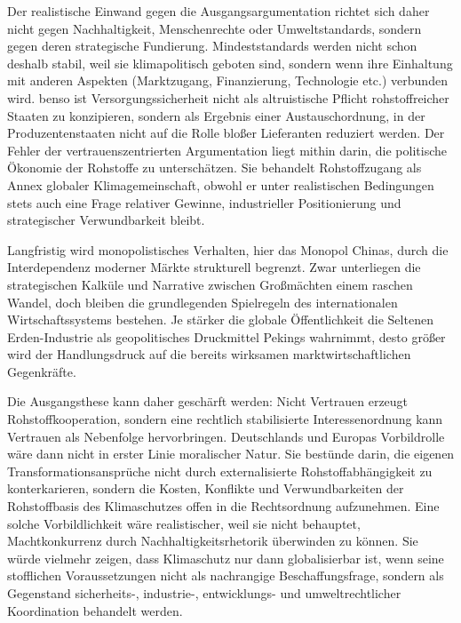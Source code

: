 \documentclass[12pt,a4paper,oneside]{book} %
\begin{document}
{Der realistische Einwand gegen die Ausgangsargumentation richtet sich daher nicht gegen Nachhaltigkeit, Menschenrechte oder Umweltstandards, sondern gegen deren strategische Fundierung. Mindeststandards werden nicht schon deshalb stabil, weil sie klimapolitisch geboten sind, sondern wenn ihre Einhaltung mit anderen Aspekten (Marktzugang, Finanzierung, Technologie etc.) verbunden wird. benso ist Versorgungssicherheit nicht als altruistische Pflicht rohstoffreicher Staaten zu konzipieren, sondern als Ergebnis einer Austauschordnung, in der Produzentenstaaten nicht auf die Rolle bloßer Lieferanten reduziert werden. Der Fehler der vertrauenszentrierten Argumentation liegt mithin darin, die politische Ökonomie der Rohstoffe zu unterschätzen. Sie behandelt Rohstoffzugang als Annex globaler Klimagemeinschaft, obwohl er unter realistischen Bedingungen stets auch eine Frage relativer Gewinne, industrieller Positionierung und strategischer Verwundbarkeit bleibt.



Langfristig wird monopolistisches Verhalten, hier das Monopol Chinas, durch die Interdependenz moderner Märkte strukturell begrenzt. Zwar unterliegen die strategischen Kalküle und Narrative zwischen Großmächten einem raschen Wandel, doch bleiben die grundlegenden Spielregeln des internationalen Wirtschaftssystems bestehen. Je stärker die globale Öffentlichkeit die Seltenen Erden-Industrie als geopolitisches Druckmittel Pekings wahrnimmt, desto größer wird der Handlungsdruck auf die bereits wirksamen marktwirtschaftlichen Gegenkräfte.

Die Ausgangsthese kann daher geschärft werden: Nicht Vertrauen erzeugt Rohstoffkooperation, sondern eine rechtlich stabilisierte Interessenordnung kann Vertrauen als Nebenfolge hervorbringen. Deutschlands und Europas Vorbildrolle wäre dann nicht in erster Linie moralischer Natur. Sie bestünde darin, die eigenen Transformationsansprüche nicht durch externalisierte Rohstoffabhängigkeit zu konterkarieren, sondern die Kosten, Konflikte und Verwundbarkeiten der Rohstoffbasis des Klimaschutzes offen in die Rechtsordnung aufzunehmen. Eine solche Vorbildlichkeit wäre realistischer, weil sie nicht behauptet, Machtkonkurrenz durch Nachhaltigkeitsrhetorik überwinden zu können. Sie würde vielmehr zeigen, dass Klimaschutz nur dann globalisierbar ist, wenn seine stofflichen Voraussetzungen nicht als nachrangige Beschaffungsfrage, sondern als Gegenstand sicherheits-, industrie-, entwicklungs- und umweltrechtlicher Koordination behandelt werden.

}
\end{document}

